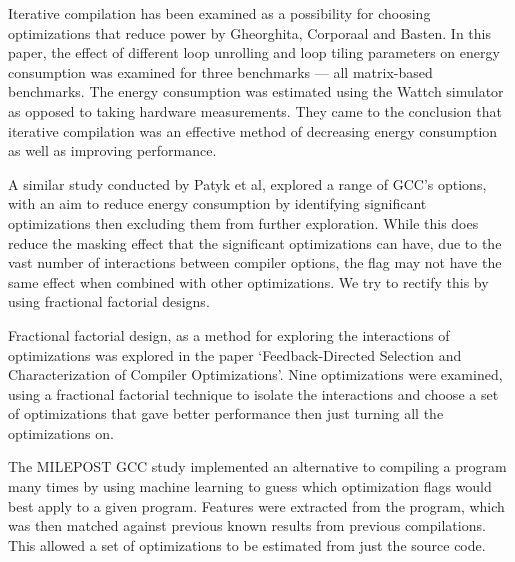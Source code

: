 \documentclass[twocolumn]{article}
\begin{document}
Iterative compilation has been examined as a possibility for choosing optimizations that reduce power by Gheorghita, Corporaal and Basten\cite{IterativeCompilationForEnergy}. In this paper, the effect of different loop unrolling and loop tiling parameters on energy consumption was examined for three benchmarks --- all matrix-based benchmarks. The energy consumption was estimated using the Wattch simulator as opposed to taking hardware measurements. They came to the conclusion that iterative compilation was an effective method of decreasing energy consumption as well as improving performance.


A similar study conducted by Patyk et al\cite{EnergyReductionCompilerOptions}, explored a range of GCC's options, with an aim to reduce energy consumption by identifying significant optimizations then excluding them from further exploration. While this does reduce the masking effect that the significant optimizations can have, due to the vast number of interactions between compiler options, the flag may not have the same effect when combined with other optimizations. We try to rectify this by using fractional factorial designs.

Fractional factorial design, as a method for exploring the interactions of optimizations was explored in the paper `Feedback-Directed Selection and Characterization of Compiler Optimizations'\cite{IntelPaper}. Nine optimizations were examined, using a fractional factorial technique to isolate the interactions and choose a set of optimizations that gave better performance then just turning all the optimizations on.

The MILEPOST GCC study implemented an alternative to compiling a program many times by using machine learning to guess which optimization flags would best apply to a given program. Features were extracted from the program, which was then matched against previous known results from previous compilations. This allowed a set of optimizations to be estimated from just the source code.
\end{document}
